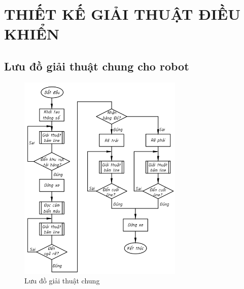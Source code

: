 \chapter{THIẾT KẾ GIẢI THUẬT ĐIỀU KHIỂN}
     \section{Lưu đồ giải thuật chung cho robot}
          \begin{figure}[H]
               \centering
               \includegraphics[width=0.7\textwidth]{pictures/chapter7/flow1.png}
               \caption{Lưu đồ giải thuật chung}
               \label{flow1}
          \end{figure}
